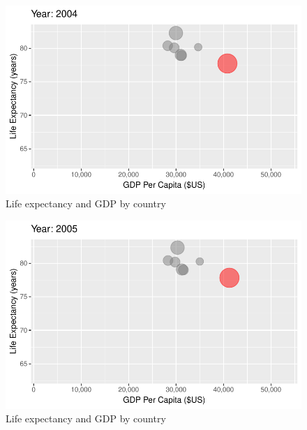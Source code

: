 \documentclass[
  letterpaper,
  DIV=11,
  numbers=noendperiod]{scrreport}
\theoremstyle{definition}
\theoremstyle{remark}
\begin{document}
\begin{figure}

{\centering \includegraphics{index_files/figure-pdf/fig-anim-country-95.pdf}

}

\caption{\label{fig-anim-country-95}Life expectancy and GDP by country}

\end{figure}

\begin{figure}

{\centering \includegraphics{index_files/figure-pdf/fig-anim-country-96.pdf}

}

\caption{\label{fig-anim-country-96}Life expectancy and GDP by country}

\end{figure}
\end{document}
